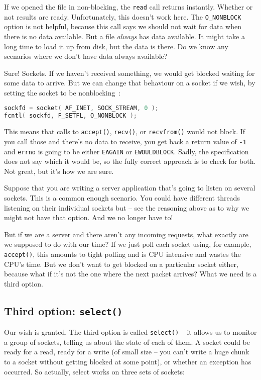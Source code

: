 If we opened the file in non-blocking, the \texttt{read} call returns instantly. Whether or not results are ready. Unfortunately, this doesn't work here. The \texttt{O\_NONBLOCK} option is not helpful, because this call says we should not wait for data when there is no data available. But a file \textit{always} has data available. It might take a long time to load it up from disk, but the data is there. Do we know any scenarios where we don't have data always available?

Sure! Sockets. If we haven't received something, we would get blocked waiting for some data to arrive. But we can change that behaviour on a socket if we wish, by setting the socket to be nonblocking~\cite{getaddrinfo}:

\begin{lstlisting}[language=C]
sockfd = socket( AF_INET, SOCK_STREAM, 0 );
fcntl( sockfd, F_SETFL, O_NONBLOCK );
\end{lstlisting}

This means that calls to \texttt{accept()}, \texttt{recv()}, or \texttt{recvfrom()} would not block. If you call those and there's no data to receive, you get back a return value of \texttt{-1} and \texttt{errno} is going to be either \texttt{EAGAIN} or \texttt{EWOULDBLOCK}. Sadly, the specification does not say which it would be, so the fully correct approach is to check for both. Not great, but it's how we are sure.

Suppose that you are writing a server application that's going to listen on several sockets. This is a common enough scenario. You could have different threads listening on their individual sockets but -- see the reasoning above as to why we might not have that option. And we no longer have to!

But if we are a server and there aren't any incoming requests, what exactly are we supposed to do with our time? If we just poll each socket using, for example, \texttt{accept()}, this amounts to tight polling and is CPU intensive and wastes the CPU's time. But we don't want to get blocked on a particular socket either, because what if it's not the one where the next packet arrives? What we need is a third option.

\subsection*{Third option: \texttt{select()}} Our wish is granted. The third option is called \texttt{select()} -- it allows us to monitor a group of sockets, telling us about the state of each of them. A socket could be ready for a read, ready for a write (of small size -- you can't write a huge chunk to a socket without getting blocked at some point), or whether an exception has occurred. So actually, select works on three sets of sockets:


